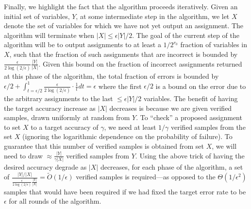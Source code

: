 \documentclass[anon,12pt]{colt2018}
\newcommand{\eps}{\epsilon}
\begin{document}
Finally, we highlight the fact that the algorithm proceeds iteratively.  Given an initial set of variables, $Y$, at some intermediate step in the algorithm, we let $X$ denote the set of variables for which we have not yet output an assignment.   The algorithm will terminate when $|X| \le \eps |Y|/2$.  The goal of the current step of the algorithm will be to output assignments to at least a $1/2^{r_0}$ fraction of variables in $X$, such that the fraction of such assignments that are incorrect is bounded by $\frac{\eps}{2\log(2/\eps)} \frac{|Y|}{|X|}.$  Given this bound on the fraction of incorrect assignments returned at this phase of the algorithm, the total fraction of errors is  bounded by $\eps/2 + \int_{t=\eps/2}^1 \frac{\eps}{2\log(2/\eps)}\cdot \frac{1}{t} dt = \eps$  where the first $\eps/2$ is a bound on the error due to the arbitrary assignments to the last $\le \eps |Y|/2$ variables.    The benefit of having the target accuracy increase as $|X|$ decreases is because we are given verified samples, drawn uniformly at random from $Y$.  To ``check'' a proposed assignment to set $X$ to a target accuracy of $\gamma$, we need at least $1/\gamma$ verified samples from the set $X$  (ignoring the logarithmic dependence on the probability of failure).  To guarantee that this number of verified samples is obtained from set $X$, we will need to draw $\approx \frac{|Y|}{\gamma |X|}$   verified samples from $Y$.   Using the above trick of having the desired accuracy degrade as $|X|$ decreases, for each phase of the algorithm, a set of $\frac{|Y|/|X|}{\frac{\eps}{2\log(2/\eps)} \frac{|Y|}{|X|}} = \tilde{O}(1/\eps)$ verified samples is required---as opposed to the $\Theta(1/\eps^2)$ samples that would have been required if we had fixed the target error rate to be $\eps$ for all rounds of the algorithm.
\end{document}

